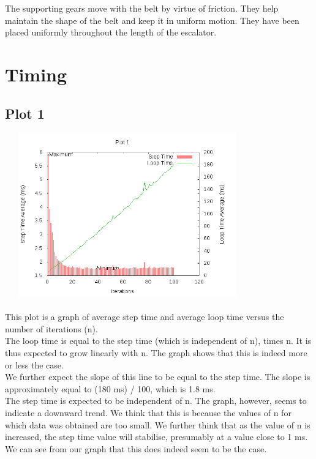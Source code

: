 \documentclass[11pt]{article}
\begin{document}
	The supporting gears move with the belt by virtue of friction. They help maintain the shape of the belt and keep it in uniform motion. They have been placed uniformly throughout the length of the escalator.

\section{Timing}

\subsection{Plot 1}

	\includegraphics[width=300pt, height=200pt]{../plots/plot1.png}\\\\
	
	This plot is a graph of average step time and average loop time versus the number of iterations (n).\\

	The loop time is equal to the step time (which is independent of n), times n. It is thus expected to grow linearly with n. The graph shows that this is indeed more or less the case.\\

	We further expect the slope of this line to be equal to the step time. The slope is approximately equal to (180 ms) / 100, which is 1.8 ms.\\

	The step time is expected to be independent of n. The graph, however, seems to indicate a downward trend. We think that this is because the values of n for which data was obtained are too small. We further think that as the value of n is increased, the step time value will stabilise, presumably at a value close to 1 ms. We can see from our graph that this does indeed seem to be the case.\\
\end{document}
